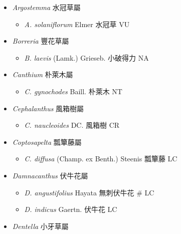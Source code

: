 
  \begin{itemize}
 \item[] \textit{Argostemma} 水冠草屬
                                
  \begin{itemize}
        \item[] \textit{A. solaniflorum} Elmer  水冠草   VU
  \end{itemize}
 \item[] \textit{Borreria} 豐花草屬
                                
  \begin{itemize}
        \item[] \textit{B. laevis} (Lamk.) Grieseb.  小破得力   NA
  \end{itemize}
 \item[] \textit{Canthium} 朴萊木屬
                                
  \begin{itemize}
        \item[] \textit{C. gynochodes} Baill.  朴萊木   NT
  \end{itemize}
 \item[] \textit{Cephalanthus} 風箱樹屬
                                
  \begin{itemize}
        \item[] \textit{C. naucleoides} DC.  風箱樹   CR
  \end{itemize}
 \item[] \textit{Coptosapelta} 瓢簞藤屬
                                
  \begin{itemize}
        \item[] \textit{C. diffusa} (Champ. ex Benth.) Steenis  瓢簞藤   LC
  \end{itemize}
 \item[] \textit{Damnacanthus} 伏牛花屬
                                
  \begin{itemize}
        \item[] \textit{D. angustifolius} Hayata  無刺伏牛花  \# LC
        \item[] \textit{D. indicus} Gaertn.  伏牛花   LC
  \end{itemize}
 \item[] \textit{Dentella} 小牙草屬
                                

\end{itemize}
